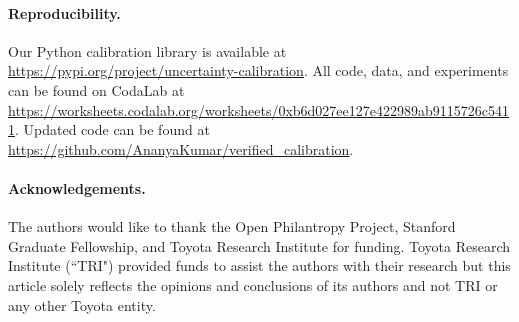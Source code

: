 
\paragraph{Reproducibility.}
Our Python calibration library is available at \url{https://pypi.org/project/uncertainty-calibration}.
All code, data, and experiments can be found on CodaLab at \url{https://worksheets.codalab.org/worksheets/0xb6d027ee127e422989ab9115726c5411}.
Updated code can be found at \url{https://github.com/AnanyaKumar/verified_calibration}.

\paragraph{Acknowledgements.}

The authors would like to thank the Open Philantropy Project, Stanford Graduate Fellowship, and Toyota Research Institute for funding. Toyota Research Institute (``TRI") provided funds to assist the authors with their research but this article solely reflects the opinions and conclusions of its authors and not TRI or any other Toyota entity.

